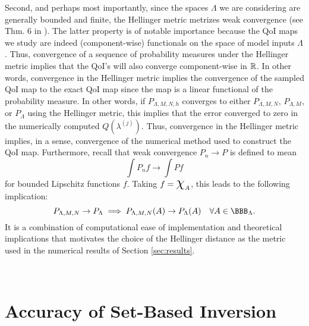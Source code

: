 Second, and perhaps most importantly, since the spaces $\Lambda$ we are considering are generally bounded and finite, the Hellinger metric metrizes weak convergence (see Thm. 6 in \cite{GS02}).
The latter property is of notable importance because the QoI maps we study are indeed (component-wise) functionals on the space of model inputs $\Lambda$. 
Thus, convergence of a sequence of probability measures under the Hellinger metric implies that the QoI's will also converge component-wise in $\mathbb{R}$. 
In other words, convergence in the Hellinger metric implies the convergence of the sampled QoI map to the exact QoI map since the map is a linear functional of the probability measure. 
In other words, if $P_{\Lambda,M,N,h}$ converges to either $P_{\Lambda,M,N}$, $P_{\Lambda,M}$, or $P_\Lambda$ using the Hellinger metric, this implies that the error converged to zero in the numerically computed $Q(\lambda^{(j)})$.
Thus, convergence in the Hellinger metric implies, in a sense, convergence of the numerical method used to construct the QoI map. 
Furthermore, recall that weak convergence $P_n \to P$ is defined to mean 
\[
\int P_n f \to \int Pf
\]
for bounded Lipschitz functions $f$. 
Taking $f = \Chi_A$, this leads to the following implication:  
\[
P_{\Lambda, M, N} \to P_\Lambda \implies P_{\Lambda, M, N} (A) \to P_\Lambda (A) \quad \forall{A\in\BBB_\Lambda}.
\]
It is a combination of computational ease of implementation and theoretical implications that motivates the choice of the Hellinger distance as the metric used in the numerical results of Section \ref{sec:results}.



\
\section{Accuracy of Set-Based Inversion}



